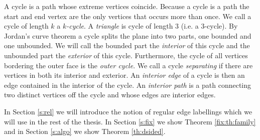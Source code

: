   A cycle is a path whose extreme vertices coincide. Because a cycle is a path the start and end vertex are the only vertices that occurs more than once. We call a cycle of length $k$  a \emph{$k$-cycle}. A \emph{triangle} is cycle of length $3$ (i.e. a $3$-cycle). By Jordan's curve theorem a cycle splits the plane into two parts, one bounded and one unbounded. We will call the bounded part the \emph{interior} of this cycle and the unbounded part the \emph{exterior} of this cycle.
  Furthermore, the cycle of all vertices bordering the outer face is the \emph{outer cycle}.
  We call a cycle \emph{separating} if there are vertices in both its interior and exterior.
  An \emph{interior edge} of a cycle is then an edge contained in the interior of the cycle.
  An \emph{interior path} is a path connecting two distinct vertices off the cycle and whose edges are interior edges.

  In Section \ref{s:rel} we will introduce the notion of regular edge labellings which we will use in the rest of the thesis.
  In Section \ref{s:fix} we show Theorem \ref{fix:th:family} and in Section \ref{s:algo} we show Theorem \ref{th:dsided}.
